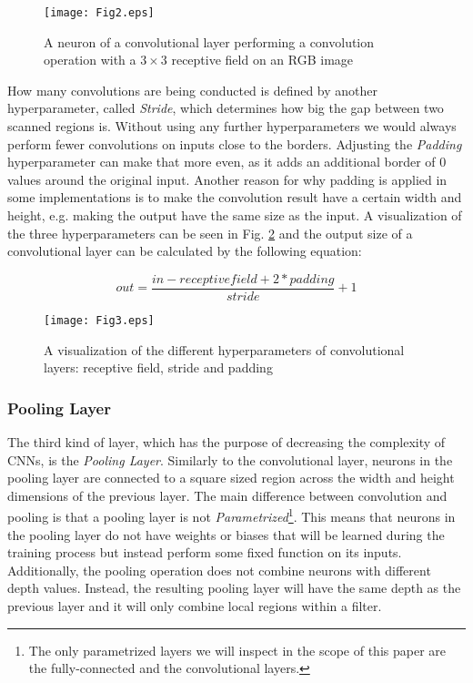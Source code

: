 \documentclass[conference]{IEEEtran}
\begin{document}
\begin{figure}
\texttt{[image: Fig2.eps]}
\caption{A neuron of a convolutional layer performing a convolution operation with a $3 \times 3$ receptive field on an RGB image}
\label{fig:conv}
\end{figure}

How many convolutions are being conducted is defined by another hyperparameter, called \emph{Stride}, which determines how big the gap between two scanned regions is.
Without using any further hyperparameters we would always perform fewer convolutions on inputs close to the borders. Adjusting the \emph{Padding} hyperparameter can make that more even, as it adds an additional border of $0$ values around the original input.
Another reason for why padding is applied in some implementations is to make the convolution result have a certain width and height, e.g. making the output have the same size as the input. A visualization of the three hyperparameters can be seen in Fig. \ref{fig:conv_hyperparameters} and the output size of a convolutional layer can be calculated by the following equation:

\begin{equation}\label{eq:conv_out}
out = \frac{in - receptive field + 2 * padding}{stride} +1
\end{equation}

\begin{figure}
\texttt{[image: Fig3.eps]}
\caption{A visualization of the different hyperparameters of convolutional layers: receptive field, stride and padding}
\label{fig:conv_hyperparameters}
\end{figure}

\subsubsection{Pooling Layer}
The third kind of layer, which has the purpose of decreasing the complexity of CNNs, is the \emph{Pooling Layer}. Similarly to the convolutional layer, neurons in the pooling layer are connected to a square sized region across the width and height dimensions of the previous layer. The main difference between convolution and pooling is that a pooling layer is not \emph{Parametrized}\footnote{The only parametrized layers we will inspect in the scope of this paper are the fully-connected and the convolutional layers.}. This means that neurons in the pooling layer do not have weights or biases that will be learned during the training process but instead perform some fixed function on its inputs. Additionally, the pooling operation does not combine neurons with different depth values. Instead, the resulting pooling layer will have the same depth as the previous layer and it will only combine local regions within a filter.
\end{document}

